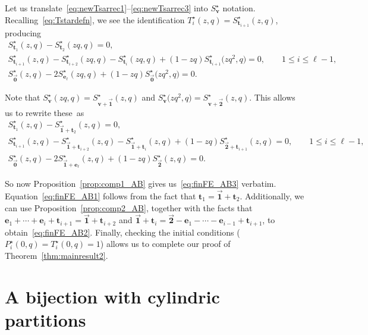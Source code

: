 \documentclass[10pt,a4paper]{amsart}
\numberwithin{equation}{section}
\theoremstyle{definition}
\newcommand{\tr}{\mathbf{t}}
\newcommand{\vv}{\mathbf{v}}
\newcommand{\ee}{\mathbf{e}}
\newcommand{\two}{\vec{\mathbf{2}}}
\newcommand{\one}{\vec{\mathbf{1}}}
\newcommand{\zero}{\vec{\mathbf{0}}}
\begin{document}
Let us translate~\eqref{eq:newTsarrec1}--\eqref{eq:newTsarrec3} into $S^\star_\vv$ notation. Recalling~\eqref{eq:Tstardefn}, we see the identification $T^\star_i(z,q) = S^\star_{\tr_{i+1}}(z,q)$, producing
\begin{gather*}
S^\star_{\tr_1}(z,q)-S^\star_{\tr_2}(zq,q) =0, \\
S^\star_{\tr_{i+1}}(z,q) - S^\star_{\tr_{i+2}}(zq,q) - S^\star_{\tr_{i}}(zq,q) + (1-zq)S^\star_{\tr_{i+1}}\bigl(zq^2,q\bigr) =0, \qquad 1 \le i \le \ell-1, \\
S^\star_{\zero}(z,q) -2S^\star_{\ee_\ell}(zq,q) + (1-zq) S^\star_{\zero}\bigl(zq^2,q\bigr) = 0.
\end{gather*}

Note that $S^\star_\vv(zq,q) = S^\star_{\vv+\one} (z,q)$ and $S^\star_\vv\bigl(zq^2,q\bigr) = S^\star_{\vv+\two} (z,q)$. This allows us to rewrite these~as
\begin{gather}
S^\star_{\tr_1}(z,q)-S^\star_{\one+\tr_2}(z,q) =0,\label{eq:finFE_AB1} \\
S^\star_{\tr_{i+1}}(z,q) - S^\star_{\one+\tr_{i+2}}(z,q) - S^\star_{\one+\tr_{i}}(z,q) + (1-zq)S^\star_{\two+\tr_{i+1}}(z,q) =0, \qquad\! 1 \le i \le \ell-1, \!\!\!\label{eq:finFE_AB2} \\
S^\star_{\zero}(z,q) - 2S^\star_{\one+\ee_\ell}(z,q) + (1-zq) S^\star_{\two}(z,q) = 0. \label{eq:finFE_AB3}
\end{gather}

So now Proposition~\ref{prop:comp1_AB} gives us~\eqref{eq:finFE_AB3} verbatim. Equation~\eqref{eq:finFE_AB1} follows from the fact that $\tr_1=\one+\tr_2$. Additionally, we can use Proposition~\ref{prop:comp2_AB}, together with the facts that $\ee_1+\cdots+\ee_{i}+\tr_{i+1} = \one+\tr_{i+2}$ and $\one+\tr_{i} =\two-\ee_1-\cdots-\ee_{i-1}+\tr_{i+1}$, to obtain~\eqref{eq:finFE_AB2}. Finally, checking the initial conditions ($P^\star_i(0,q)=T^\star_i(0,q)=1$) allows us to complete our proof of Theorem~\ref{thm:mainresult2}.

\section{A bijection with cylindric partitions}\label{sec:6}
\end{document}
